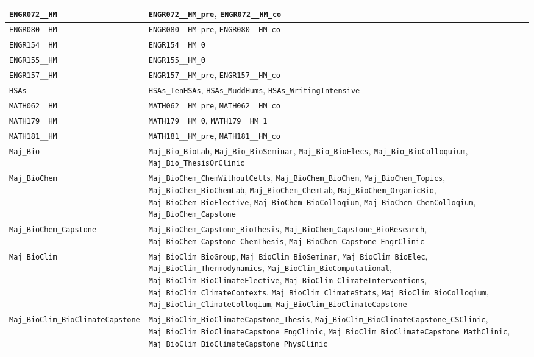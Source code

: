 \begin{longtable}{|p{4.4in}|p{4.4in}|}
    \verb|ENGR072__HM| & \verb|ENGR072__HM_pre|, \verb|ENGR072__HM_co|\\\hline
    \verb|ENGR080__HM| & \verb|ENGR080__HM_pre|, \verb|ENGR080__HM_co|\\\hline
    \verb|ENGR154__HM| & \verb|ENGR154__HM_0|\\\hline
    \verb|ENGR155__HM| & \verb|ENGR155__HM_0|\\\hline
    \verb|ENGR157__HM| & \verb|ENGR157__HM_pre|, \verb|ENGR157__HM_co|\\\hline
    \verb|HSAs| & \verb|HSAs_TenHSAs|, \verb|HSAs_MuddHums|, \verb|HSAs_WritingIntensive|\\\hline
    \verb|MATH062__HM| & \verb|MATH062__HM_pre|, \verb|MATH062__HM_co|\\\hline
    \verb|MATH179__HM| & \verb|MATH179__HM_0|, \verb|MATH179__HM_1|\\\hline
    \verb|MATH181__HM| & \verb|MATH181__HM_pre|, \verb|MATH181__HM_co|\\\hline
    \verb|Maj_Bio| & \verb|Maj_Bio_BioLab|, \verb|Maj_Bio_BioSeminar|, \verb|Maj_Bio_BioElecs|, \verb|Maj_Bio_BioColloquium|, \verb|Maj_Bio_ThesisOrClinic|\\\hline
    \verb|Maj_BioChem| & \verb|Maj_BioChem_ChemWithoutCells|, \verb|Maj_BioChem_BioChem|, \verb|Maj_BioChem_Topics|, \verb|Maj_BioChem_BioChemLab|, \verb|Maj_BioChem_ChemLab|, \verb|Maj_BioChem_OrganicBio|, \verb|Maj_BioChem_BioElective|, \verb|Maj_BioChem_BioColloqium|, \verb|Maj_BioChem_ChemColloqium|, \verb|Maj_BioChem_Capstone|\\\hline
    \verb|Maj_BioChem_Capstone| & \verb|Maj_BioChem_Capstone_BioThesis|, \verb|Maj_BioChem_Capstone_BioResearch|, \verb|Maj_BioChem_Capstone_ChemThesis|, \verb|Maj_BioChem_Capstone_EngrClinic|\\\hline
    \verb|Maj_BioClim| & \verb|Maj_BioClim_BioGroup|, \verb|Maj_BioClim_BioSeminar|, \verb|Maj_BioClim_BioElec|, \verb|Maj_BioClim_Thermodynamics|, \verb|Maj_BioClim_BioComputational|, \verb|Maj_BioClim_BioClimateElective|, \verb|Maj_BioClim_ClimateInterventions|, \verb|Maj_BioClim_ClimateContexts|, \verb|Maj_BioClim_ClimateStats|, \verb|Maj_BioClim_BioColloqium|, \verb|Maj_BioClim_ClimateColloqium|, \verb|Maj_BioClim_BioClimateCapstone|\\\hline
    \verb|Maj_BioClim_BioClimateCapstone| & \verb|Maj_BioClim_BioClimateCapstone_Thesis|, \verb|Maj_BioClim_BioClimateCapstone_CSClinic|, \verb|Maj_BioClim_BioClimateCapstone_EngClinic|, \verb|Maj_BioClim_BioClimateCapstone_MathClinic|, \verb|Maj_BioClim_BioClimateCapstone_PhysClinic|\\\hline

\end{longtable}
